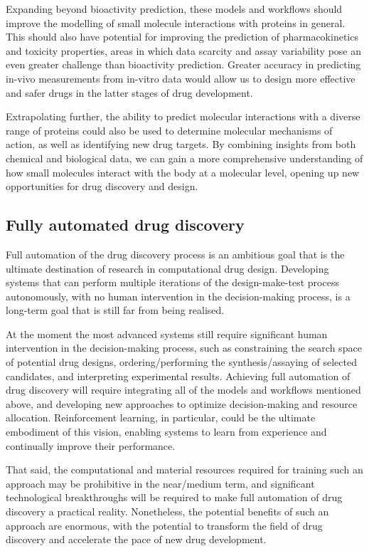 Expanding beyond bioactivity prediction, these models and workflows should improve the modelling of small molecule interactions with proteins in general. This should also have potential for improving the prediction of pharmacokinetics and toxicity properties, areas in which data scarcity and assay variability pose an even greater challenge than bioactivity prediction. Greater accuracy in predicting in-vivo measurements from in-vitro data would allow us to design more effective and safer drugs in the latter stages of drug development.

Extrapolating further, the ability to predict molecular interactions with a diverse range of proteins could also be used to determine molecular mechanisms of action, as well as identifying new drug targets. By combining insights from both chemical and biological data, we can gain a more comprehensive understanding of how small molecules interact with the body at a molecular level, opening up new opportunities for drug discovery and design.

\subsection{Fully automated drug discovery}
Full automation of the drug discovery process is an ambitious goal that is the ultimate destination of research in computational drug design. Developing systems that can perform multiple iterations of the design-make-test process autonomously, with no human intervention in the decision-making process, is a long-term goal that is still far from being realised.

At the moment the most advanced systems still require significant human intervention in the decision-making process, such as constraining the search space of potential drug designs, ordering/performing the synthesis/assaying of selected candidates, and interpreting experimental results. Achieving full automation of drug discovery will require integrating all of the models and workflows mentioned above, and developing new approaches to optimize decision-making and resource allocation. Reinforcement learning, in particular, could be the ultimate embodiment of this vision, enabling systems to learn from experience and continually improve their performance.

That said, the computational and material resources required for training such an approach may be prohibitive in the near/medium term, and significant technological breakthroughs will be required to make full automation of drug discovery a practical reality. Nonetheless, the potential benefits of such an approach are enormous, with the potential to transform the field of drug discovery and accelerate the pace of new drug development.
